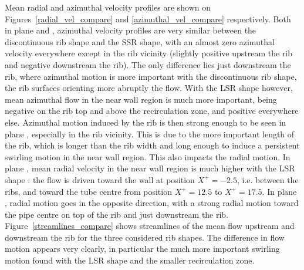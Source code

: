 Mean radial and azimuthal velocity profiles are shown on Figures~\ref{radial_vel_compare} and \ref{azimuthal_vel_compare} respectively. Both in plane  and , azimuthal velocity profiles are very similar between the discontinuous rib shape and the SSR shape, with an almost zero azimuthal velocity everywhere except in the rib vicinity (slightly positive upstream the rib and negative downstream the rib). The only difference lies just downstream the rib, where azimuthal motion is more important with the discontinuous rib shape, the rib surfaces orienting more abruptly the flow. With the LSR shape however, mean azimuthal flow in the near wall region is much more important, being negative on the rib top and above the recirculation zone, and positive everywhere else. Azimuthal motion induced by the rib is then strong enough to be seen in plane , especially in the rib vicinity. This is due to the more important length of the rib, which is longer than the rib width and long enough to induce a persistent swirling motion in the near wall region. This also impacts the radial motion. In plane , mean radial velocity in the near wall region is much higher with the LSR shape : the flow is driven toward the wall at position $X^+=-2.5$, i.e. between the ribs, and toward the tube centre from position $X^+=12.5$ to $X^+=17.5$. In plane , radial motion goes in the opposite direction, with a strong radial motion toward the pipe centre on top of the rib and just downstream the rib. Figure~\ref{streamlines_compare} shows streamlines of the mean flow upstream and downstream the rib for the three considered rib shapes. The difference in flow motion appears very clearly, in particular the much more important swirling motion found with the LSR shape and the smaller recirculation zone.\\

